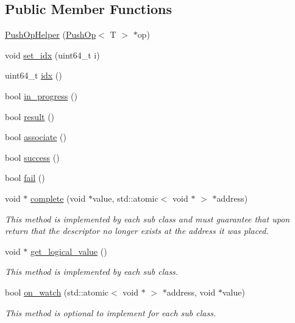 \subsection*{Public Member Functions}
\begin{DoxyCompactItemize}
\item 
\hyperlink{classtervel_1_1containers_1_1wf_1_1vector_1_1_push_op_helper_acc95d398d2f1a4bd3c45c4298c725890}{Push\+Op\+Helper} (\hyperlink{classtervel_1_1containers_1_1wf_1_1vector_1_1_push_op}{Push\+Op}$<$ T $>$ $\ast$op)
\item 
void \hyperlink{classtervel_1_1containers_1_1wf_1_1vector_1_1_push_op_helper_a115505902a70a19edfaef728b52f4412}{set\+\_\+idx} (uint64\+\_\+t i)
\item 
uint64\+\_\+t \hyperlink{classtervel_1_1containers_1_1wf_1_1vector_1_1_push_op_helper_ad4d9ab60599e150df880aa38c47c45cd}{idx} ()
\item 
bool \hyperlink{classtervel_1_1containers_1_1wf_1_1vector_1_1_push_op_helper_a084d0f4f0f5142710a9fcafb982f21ec}{in\+\_\+progress} ()
\item 
bool \hyperlink{classtervel_1_1containers_1_1wf_1_1vector_1_1_push_op_helper_a010f036e1c51a25d5fcf152407b63e2b}{result} ()
\item 
bool \hyperlink{classtervel_1_1containers_1_1wf_1_1vector_1_1_push_op_helper_ac34386c36abb6e0ba4c8224661b7a931}{associate} ()
\item 
bool \hyperlink{classtervel_1_1containers_1_1wf_1_1vector_1_1_push_op_helper_a069caab9b05921b39a012ee4afde6eb7}{success} ()
\item 
bool \hyperlink{classtervel_1_1containers_1_1wf_1_1vector_1_1_push_op_helper_ae967c33c5e34bc9a9107043d0738fae2}{fail} ()
\item 
void $\ast$ \hyperlink{classtervel_1_1containers_1_1wf_1_1vector_1_1_push_op_helper_a8faede3c50015027a4738b5a626c1ea6}{complete} (void $\ast$value, std\+::atomic$<$ void $\ast$ $>$ $\ast$address)
\begin{DoxyCompactList}\small\item\em This method is implemented by each sub class and must guarantee that upon return that the descriptor no longer exists at the address it was placed. \end{DoxyCompactList}\item 
void $\ast$ \hyperlink{classtervel_1_1containers_1_1wf_1_1vector_1_1_push_op_helper_aa8ba2c9d99007ae04325294413601cff}{get\+\_\+logical\+\_\+value} ()
\begin{DoxyCompactList}\small\item\em This method is implemented by each sub class. \end{DoxyCompactList}\item 
bool \hyperlink{classtervel_1_1containers_1_1wf_1_1vector_1_1_push_op_helper_a26ce47d7b64eedcf1983508f5a60d5b7}{on\+\_\+watch} (std\+::atomic$<$ void $\ast$ $>$ $\ast$address, void $\ast$value)
\begin{DoxyCompactList}\small\item\em This method is optional to implement for each sub class. \end{DoxyCompactList}\end{DoxyCompactItemize}
